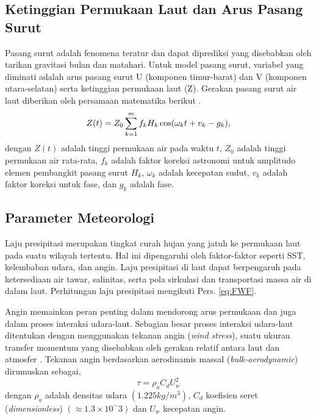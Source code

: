 \begin{spacing}{1.5}
	\subsection[Ketinggian Permukaan Laut dan Arus Pasang Surut]{Ketinggian Permukaan Laut dan Arus Pasang Surut}
	Pasang surut adalah fenomena teratur dan dapat diprediksi yang disebabkan oleh tarikan gravitasi bulan dan matahari. Untuk model pasang surut, variabel yang diminati adalah arus pasang surut U (komponen timur-barat) dan V (komponen utara-selatan) serta ketinggian permukaan laut (Z). Gerakan pasang surut air laut diberikan oleh persamaan matematika berikut \cite{wahyudi2019numerical}.
	\begin{equation}\label{eq:uvtide}\\
		\begin{aligned}
			Z(t) = Z_0 \sum_{k=1}^{m}f_kH_k \cos(\omega_k t+v_k-g_k),
		\end{aligned}
	\end{equation} 
	dengan $Z(t)$ adalah tinggi permukaan air pada waktu $t$, $Z_0$ adalah tinggi permukaan air rata-rata, $f_k$ adalah faktor koreksi astronomi untuk amplitudo elemen pembangkit pasang surut $H_k$, $\omega_k$ adalah kecepatan sudut, $v_k$ adalah faktor koreksi untuk fase, dan $g_k$ adalah fase.
	
	
	\subsection[Parameter Meteorologi]{Parameter Meteorologi}
	Laju presipitasi merupakan tingkat curah hujan yang jatuh ke permukaan laut pada suatu wilayah tertentu. Hal ini dipengaruhi oleh faktor-faktor seperti SST, kelembaban udara, dan angin. Laju presipitasi di laut dapat berpengaruh pada ketersediaan air tawar, salinitas, serta pola sirkulasi dan transportasi massa air di dalam laut. Perhitungan laju presipitasi mengikuti Pers. \ref{eq:FWF}. 
	
	Angin memainkan peran penting dalam mendorong arus permukaan dan juga dalam proses interaksi udara-laut. Sebagian besar proses interaksi udara-laut ditentukan dengan menggunakan tekanan angin (\textit{wind stress}), suatu ukuran transfer momentum yang disebabkan oleh gerakan relatif antara laut dan atmosfer . Tekanan angin berdasarkan aerodinamis massal (\textit{bulk-aerodynamic}) dirumuskan sebagai,
	\begin{equation}
		\tau = \rho_a C_d U_w^2
	\end{equation}
	dengan $\rho_a$ adalah densitas udara $(1.225 kg/m^3)$, $C_d$ koefisien seret (\textit{dimensionless}) $(\approx 1.3 \times 10^-3)$ dan $U_w$ kecepatan angin.
	

\end{spacing}
